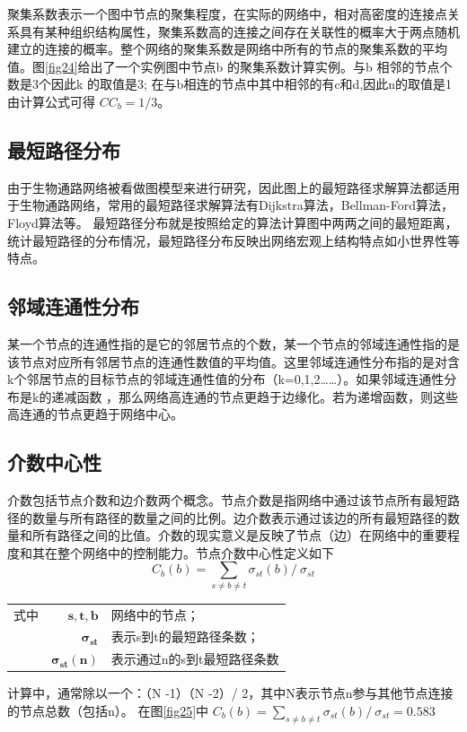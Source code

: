 聚集系数表示一个图中节点的聚集程度，在实际的网络中，相对高密度的连接点关系具有某种组织结构属性，聚集系数高的连接之间存在关联性的概率大于两点随机建立的连接的概率。整个网络的聚集系数是网络中所有的节点的聚集系数的平均值。图\ref{fig24}给出了一个实例图中节点b 的聚集系数计算实例。与b 相邻的节点个数是3个因此k 的取值是3; 在与b相连的节点中其中相邻的有c和d,因此n的取值是1由计算公式可得 $CC_{b}=1/3$。


\subsection{最短路径分布}
由于生物通路网络被看做图模型来进行研究，因此图上的最短路径求解算法都适用于生物通路网络，常用的最短路径求解算法有Dijkstra\cite{}算法，Bellman-Ford\cite{}算法，Floyd\cite{}算法等。
最短路径分布就是按照给定的算法计算图中两两之间的最短距离，统计最短路径的分布情况，最短路径分布反映出网络宏观上结构特点如小世界性等特点\cite{Article Navigation
Computing topological parameters of biological networks}。

\subsection{邻域连通性分布}
某一个节点的连通性指的是它的邻居节点的个数，某一个节点的邻域连通性指的是该节点对应所有邻居节点的连通性数值的平均值。这里邻域连通性分布指的是对含k个邻居节点的目标节点的邻域连通性值的分布（k=0,1,2……）。如果邻域连通性分布是k的递减函数 ，那么网络高连通的节点更趋于边缘化。若为递增函数，则这些高连通的节点更趋于网络中心。
\subsection{介数中心性}
介数包括节点介数和边介数两个概念。节点介数是指网络中通过该节点所有最短路径的数量与所有路径的数量之间的比例。边介数表示通过该边的所有最短路径的数量和所有路径之间的比值。介数的现实意义是反映了节点（边）在网络中的重要程度和其在整个网络中的控制能力。节点介数中心性定义如下
\begin{equation}\label{eq26}
	C_{b}( b) =\sum\limits _{s\neq b\neq t} \sigma_{st}( b) /\ \sigma_{st}
\end{equation}

\begin{tabularx}{\textwidth}{@{}l@{\quad}r@{———}X@{}}
式中 & $\boldsymbol{s,t,b}$ &  网络中的节点；\\
	& $\boldsymbol{ \sigma_{st}}$ &   表示s到t的最短路径条数；\\
	& $\boldsymbol{\sigma_{st}( n)}$ &	表示通过n的s到t最短路径条数 \\
\end{tabularx}\vspace{3.15bp}
计算中，通常除以一个：（N -1）（N -2）/ 2，其中N表示节点n参与其他节点连接的节点总数（包括n）。
在图\ref{fig25}中 $C_{b}( b) =\sum\limits _{s\neq b\neq t} \sigma_{st}( b) /\ \sigma_{st} =  0.583$

